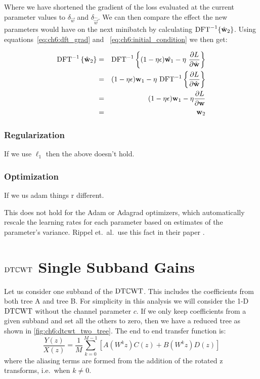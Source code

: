 Where we have shortened the gradient of the loss evaluated at the current
parameter values to $\delta_{\vec{w}}$ and $\delta_{\hat{\vec{w}}}$.
We can then compare the effect the new parameters would have on the next
minibatch by calculating $\mathrm{DFT}^{-1} \{\hat{\mathbf{w}}_2 \}$. Using
equations~\ref{eq:ch6:dft_grad} and ~\ref{eq:ch6:initial_condition} we then get:

\begin{eqnarray}
  \IFT{\hat{\vec{w}}_2} &=& \IFT{(1-\eta\epsilon)\hat{\vec{w}_1} - \eta\ \dydx{L}{\hat{\vec{w}}}} \\       
                        & = & (1-\eta\epsilon)\vec{w}_1 - \eta\ \IFT{ \dydx{L}{\hat{\vec{w}}}} \\
                        & = & (1-\eta\epsilon)\vec{w}_1 - \eta \dydx{L}{\vec{w}} \\
                        & = & \vec{w}_2
\end{eqnarray}

\subsection{Regularization}
If we use $\ell_1$ then the above doesn't hold.

\subsection{Optimization}
If we us adam things r different.

This does not hold for the Adam \cite{kingma_adam:_2014} or Adagrad \cite{}
optimizers, which automatically rescale the learning rates for each parameter
based on estimates of the parameter's variance. Rippel et.\ al.\ use this fact
in their paper \cite{rippel_spectral_2015}.

\chapter{$\mathrm{DT}\mathbb{C}\mathrm{WT}$ Single Subband Gains}\label{app:ch6:dtcwt}

\begin{figure}
  \centering
  
  \label{fig:ch6:dtcwt_two_tree}
\end{figure}

Let us consider one subband of the $\mathrm{DT}\mathbb{C}\mathrm{WT}$. This includes the coefficients from
both tree A and tree B. For simplicity in this analysis we will consider the 1-D
$\mathrm{DT}\mathbb{C}\mathrm{WT}$ without the channel parameter $c$. If we only keep coefficients from a given
subband and set all the others to zero, then we have a reduced tree as shown in
\autoref{fig:ch6:dtcwt_two_tree}. The end to end transfer function is:
%
\begin{equation}
  \frac{Y(z)}{X(z)} = \frac{1}{M} \sum_{k=0}^{M-1} \left[A(W^k z)C(z) + B(W^k z)D(z)\right]
  \label{eq:ch6:aliasing}
\end{equation}
%
where the aliasing terms are formed from the addition of the rotated z
transforms, i.e.\ when $k \neq 0$.

